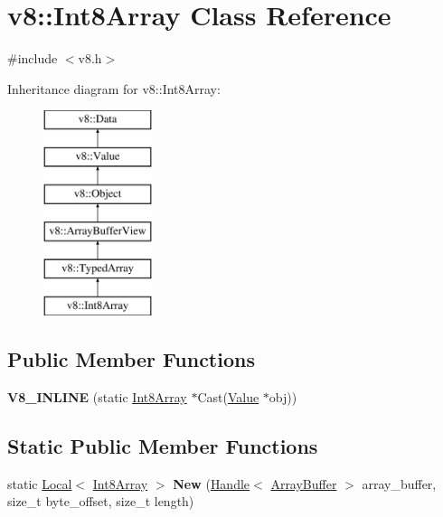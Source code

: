 \hypertarget{classv8_1_1_int8_array}{}\section{v8\+:\+:Int8\+Array Class Reference}
\label{classv8_1_1_int8_array}


{\ttfamily \#include $<$v8.\+h$>$}

Inheritance diagram for v8\+:\+:Int8\+Array\+:\begin{figure}[H]
\begin{center}
\leavevmode
\includegraphics[height=6.000000cm]{classv8_1_1_int8_array}
\end{center}
\end{figure}
\subsection*{Public Member Functions}
\begin{DoxyCompactItemize}
\item 
\hypertarget{classv8_1_1_int8_array_a2f12a8e33c37a5ac6c4b1141b868d4c4}{}{\bfseries V8\+\_\+\+I\+N\+L\+I\+N\+E} (static \hyperlink{classv8_1_1_int8_array}{Int8\+Array} $\ast$Cast(\hyperlink{classv8_1_1_value}{Value} $\ast$obj))\label{classv8_1_1_int8_array_a2f12a8e33c37a5ac6c4b1141b868d4c4}

\end{DoxyCompactItemize}
\subsection*{Static Public Member Functions}
\begin{DoxyCompactItemize}
\item 
\hypertarget{classv8_1_1_int8_array_a40454c011895180c803650ba7294139b}{}static \hyperlink{classv8_1_1_local}{Local}$<$ \hyperlink{classv8_1_1_int8_array}{Int8\+Array} $>$ {\bfseries New} (\hyperlink{classv8_1_1_handle}{Handle}$<$ \hyperlink{classv8_1_1_array_buffer}{Array\+Buffer} $>$ array\+\_\+buffer, size\+\_\+t byte\+\_\+offset, size\+\_\+t length)\label{classv8_1_1_int8_array_a40454c011895180c803650ba7294139b}

\end{DoxyCompactItemize}
